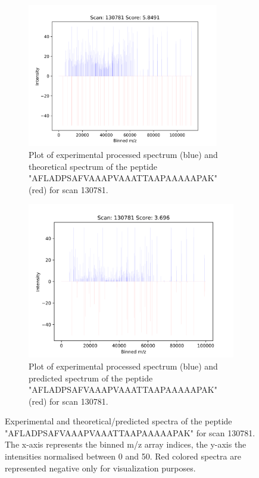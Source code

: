 \documentclass[11pt]{article}
\begin{document}
\begin{figure}
\centering
\begin{subfigure}[b]{1\textwidth}
\centering
    \includegraphics[width=0.92\textwidth]{figs/scan_130781_ps=False_.png}
   \caption{Plot of experimental processed spectrum (blue) and theoretical spectrum of the peptide "AFLADPSAFVAAAPVAAATTAAPAAAAAPAK" (red) for scan 130781.}
   \label{fig:theo} 
\end{subfigure}
\begin{subfigure}[b]{1\textwidth}
\centering
   \includegraphics[width=0.92
   \textwidth]{figs/scan_130781_ps=True_HCD.png}
   \caption{Plot of experimental processed spectrum (blue) and predicted spectrum of the peptide "AFLADPSAFVAAAPVAAATTAAPAAAAAPAK" (red) for scan 130781.}
   \label{fig:predict}
\end{subfigure}
\caption{Experimental and theoretical/predicted spectra of the peptide "AFLADPSAFVAAAPVAAATTAAPAAAAAPAK" for scan 130781. The x-axis represents the binned m/z array indices, the y-axis the intensities normalised between 0 and 50. Red colored spectra are represented negative only for visualization purposes.}
\label{fig:scan130781}
\end{figure}
\end{document}
